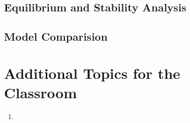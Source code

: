 \subsection{Equilibrium and Stability Analysis}
\subsection{Model Comparision}

\section{Additional Topics for the Classroom}

\begin{enumerate}
\item 
\end{enumerate}


